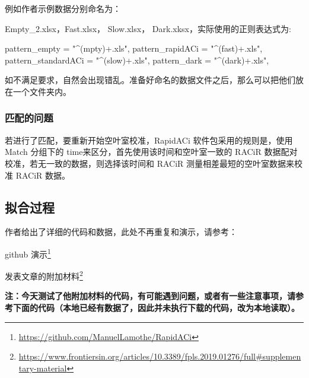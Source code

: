 \documentclass[
]{krantz}
\makeatletter
\newenvironment{Shaded}{\begin{snugshade}}{\end{snugshade}}
\newcommand{\NormalTok}[1]{#1}
\newcommand{\OtherTok}[1]{\textcolor[rgb]{0.56,0.35,0.01}{#1}}
\newcommand{\StringTok}[1]{\textcolor[rgb]{0.31,0.60,0.02}{#1}}
\renewcommand{\href}[2]{#2\footnote{\url{#1}}}
\newenvironment{kframe}{%
\medskip{}
\setlength{\fboxsep}{.8em}
 \def\at@end@of@kframe{}%
 \ifinner\ifhmode%
  \def\at@end@of@kframe{\end{minipage}}%
  \begin{minipage}{\columnwidth}%
 \fi\fi%
 \def\FrameCommand##1{\hskip\@totalleftmargin \hskip-\fboxsep
 \colorbox{shadecolor}{##1}\hskip-\fboxsep
     \hskip-\linewidth \hskip-\@totalleftmargin \hskip\columnwidth}%
 \MakeFramed {\advance\hsize-\width
   \@totalleftmargin\z@ \linewidth\hsize
   \@setminipage}}%
 {\par\unskip\endMakeFramed%
 \at@end@of@kframe}
\renewenvironment{Shaded}{\begin{kframe}}{\end{kframe}}
\makeatother
\begin{document}
例如作者示例数据分别命名为：

Empty\_2.xlsx，Fast.xlsx， Slow.xlsx， Dark.xksx，实际使用的正则表达式为:

\begin{Shaded}
\begin{Highlighting}[]
\NormalTok{pattern\_empty       }\OtherTok{=} \StringTok{"\^{}(mpty)+.xls"}\NormalTok{,      }
\NormalTok{pattern\_rapidACi    }\OtherTok{=} \StringTok{"\^{}(fast)+.xls"}\NormalTok{,      }
\NormalTok{pattern\_standardACi }\OtherTok{=} \StringTok{"\^{}(slow)+.xls"}\NormalTok{,      }
\NormalTok{pattern\_dark        }\OtherTok{=} \StringTok{"\^{}(dark)+.xls"}\NormalTok{,}
\end{Highlighting}
\end{Shaded}

如不满足要求，自然会出现错乱。准备好命名的数据文件之后，那么可以把他们放在一个文件夹内。

\hypertarget{match-time}{%
\subsubsection{匹配的问题}\label{match-time}}

若进行了匹配，要重新开始空叶室校准，RapidACi 软件包采用的规则是，使用 Match 分组下的 time来区分，首先使用该时间和空叶室一致的 RACiR 数据配对校准，若无一致的数据，则选择该时间和 RACiR 测量相差最短的空叶室数据来校准 RACiR 数据。

\hypertarget{conifer-racir-fit}{%
\subsection{拟合过程}\label{conifer-racir-fit}}

作者给出了详细的代码和数据，此处不再重复和演示，请参考：

\href{https://github.com/ManuelLamothe/RapidACi}{github 演示}

\href{https://www.frontiersin.org/articles/10.3389/fpls.2019.01276/full\#supplementary-material}{发表文章的附加材料}

\textbf{注：今天测试了他附加材料的代码，有可能遇到问题，或者有一些注意事项，请参考下面的代码（本地已经有数据了，因此并未执行下载的代码，改为本地读取）。}
\end{document}
